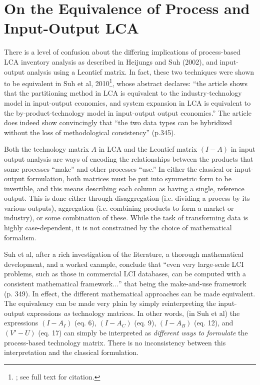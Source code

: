\section{On the Equivalence of Process and Input-Output LCA}

There is a level of confusion about the differing implications of process-based LCA inventory analysis as described in Heijungs and Suh (2002), and input-output analysis using a Leontief matrix.  In fact, these two techniques were shown to be equivalent in Suh et al, 2010\footnote{; see full text for citation.}, whose abstract declares: ``the article shows that the partitioning method in LCA is equivalent to the industry-technology model in input-output economics, and system expansion in LCA is equivalent to the by-product-technology model in input-output output economics.''  The article does indeed show convincingly that ``the two data types can be hybridized without the loss of methodological consistency'' (p.345).

   Both the technology matrix $A$ in LCA and the Leontief matrix $(I-A)$ in input output analysis are ways of encoding the relationships between the products that some processes ``make'' and other processes ``use.''  In either the classical or input-output formulation, both matrices must be put into symmetric form to be invertible, and this means describing each column as having a single, reference output.  This is done either through disaggregation (i.e. dividing a process by its various outputs), aggregation (i.e. combining products to form a market or industry), or some combination of these.  While the task of transforming data is highly case-dependent, it is not constrained by the choice of mathematical formalism.  
   
   Suh et al, after a rich investigation of the literature, a thorough mathematical development, and a worked example, conclude that ``even very large-scale LCI problems, such as those in commercial LCI databases, can be computed with a consistent mathematical framework$\ldots$'' that being the make-and-use framework (p. 349).  In effect, the different mathematical approaches can be made equivalent.  The equivalency can be made very plain by simply reinterpreting the input-output expressions \textit{as} technology matrices.  In other words, (in Suh et al) the expressions $(I-A_I)$ (eq. 6), $(I-A_C)$ (eq. 9), $(I-A_B)$ (eq. 12), and $(V'-U)$ (eq. 17) can simply be interpreted as \textit{different ways to formulate} the process-based technology matrix.  There is no inconsistency between this interpretation and the classical formulation.  

